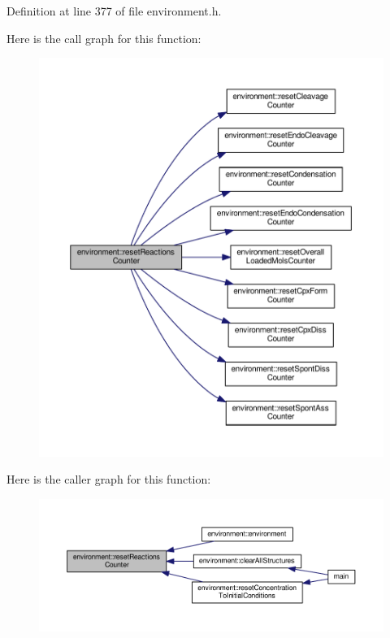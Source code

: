 Definition at line 377 of file environment.\-h.



Here is the call graph for this function\-:\nopagebreak
\begin{figure}[H]
\begin{center}
\leavevmode
\includegraphics[width=350pt]{a00011_a5c8713237992b28c39199a7aea3f9ea0_cgraph}
\end{center}
\end{figure}




Here is the caller graph for this function\-:\nopagebreak
\begin{figure}[H]
\begin{center}
\leavevmode
\includegraphics[width=350pt]{a00011_a5c8713237992b28c39199a7aea3f9ea0_icgraph}
\end{center}
\end{figure}


